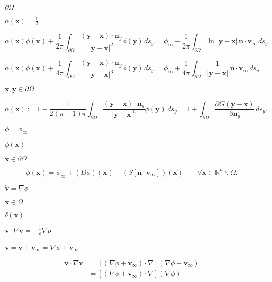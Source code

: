 \documentclass{article}
\begin{document}
$\partial\Omega$
\pagebreak

$\alpha(\mathbf{x})=\frac 12$
\pagebreak

\[ \alpha(\mathbf{x}) \phi(\mathbf{x}) + \frac{1}{2\pi}\int_{\partial \Omega} \frac{ (\mathbf{y}-\mathbf{x})\cdot\mathbf{n}_y }{ |\mathbf{y}-\mathbf{x}|^2 } \phi(\mathbf{y}) \,ds_y = \phi_\infty -\frac{1}{2\pi}\int_{\partial \Omega} \ln|\mathbf{y}-\mathbf{x}| \, \mathbf{n}\cdot\mathbf{v_\infty}\,ds_y \]
\pagebreak

\[ \alpha(\mathbf{x}) \phi(\mathbf{x}) + \frac{1}{4\pi}\int_{\partial \Omega} \frac{ (\mathbf{y}-\mathbf{x})\cdot\mathbf{n}_y }{ |\mathbf{y}-\mathbf{x}|^3 }\phi(\mathbf{y})\,ds_y = \phi_\infty + \frac{1}{4\pi}\int_{\partial \Omega} \frac{1}{|\mathbf{y}-\mathbf{x}|} \, \mathbf{n}\cdot\mathbf{v_\infty}\,ds_y \]
\pagebreak

$\mathbf{x},\mathbf{y}\in\partial\Omega$
\pagebreak

\[ \alpha(\mathbf{x}) := 1 - \frac{1}{2(n-1)\pi}\int_{\partial \Omega} \frac{ (\mathbf{y}-\mathbf{x})\cdot\mathbf{n}_y } { |\mathbf{y}-\mathbf{x}|^{n} }\phi(\mathbf{y})\,ds_y = 1+ \int_{\partial \Omega} \frac{ \partial G(\mathbf{y}-\mathbf{x}) }{\partial \mathbf{n}_y} \, ds_y. \]
\pagebreak

$\phi = \phi_\infty$
\pagebreak

$\phi(\mathbf{x})$
\pagebreak

$\mathbf{x}\in\partial\Omega$
\pagebreak

\[ \phi(\mathbf{x}) = \phi_\infty + (D\phi)(\mathbf{x}) + \left(S[\mathbf{n}\cdot\mathbf{v}_\infty]\right)(\mathbf{x}) \qquad \forall\mathbf{x}\in \mathbb{R}^n\backslash\Omega. \]
\pagebreak

$\mathbf{\tilde v}=\nabla \phi$
\pagebreak

$\mathbf{x} \in \Omega$
\pagebreak

$\delta(\mathbf{x})$
\pagebreak

$\mathbf{v}\cdot\nabla\mathbf{v} = -\frac 1\rho \nabla p$
\pagebreak

$\mathbf{v}=\mathbf{\tilde v}+\mathbf{v}_\infty=\nabla\phi+\mathbf{v}_\infty$
\pagebreak

\begin{align*} \mathbf{v}\cdot\nabla\mathbf{v} &= [(\nabla\phi+\mathbf{v}_\infty)\cdot\nabla] (\nabla\phi+\mathbf{v}_\infty) \\ &= [(\nabla\phi+\mathbf{v}_\infty)\cdot\nabla] (\nabla\phi) \end{align*}
\pagebreak
\end{document}
